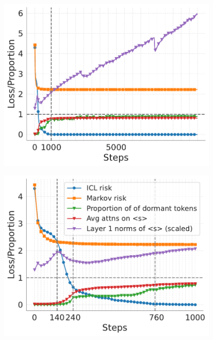 \begin{figure}[t]
\centering
    \begin{minipage}{0.4\textwidth}
      \centering
      \label{fig:pretraining-dynamics-long}
      \vspace{-.2em}
      \includegraphics[width=\linewidth]{Figures/figures_pretraining/dormant_copy/dormant_copy_dynamics_long.pdf}
  \end{minipage}
    \begin{minipage}{0.4\textwidth}
      \centering
      \label{fig:pretraining-dynamics}
      \vspace{-.2em}
      \includegraphics[width=\linewidth]{Figures/figures_pretraining/dormant_copy/dormant_copy_dynamics.pdf}
  \end{minipage}
  \hspace{-1em}


\end{figure}
